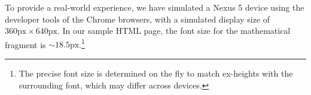 \documentclass{llncs}
\begin{document}

To provide a real-world experience, we have simulated a Nexus 5 device using 
the developer tools of the Chrome browsers, with a simulated display size of 
$360\mathrm{px} \times 640\mathrm{px}$. In our sample HTML page, the font size for the 
mathematical fragment is $\mathbin{\sim} 18.5\mathrm{px}$.\footnote{The precise font 
size is determined on the fly to match ex-heights with the surrounding font, 
which may differ across devices.} 
\end{document}
